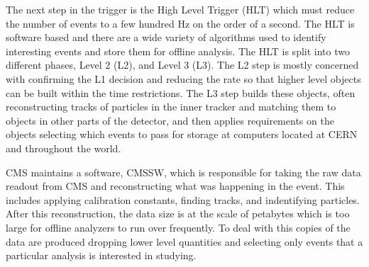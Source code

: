 
The next step in the trigger is the High Level Trigger (HLT) which must reduce the number of events to a few hundred Hz on the order of a second. The HLT
is software based and there are a wide variety of algorithms used to identify interesting events and store them for offline analysis. The HLT is split into two different
phases, Level 2 (L2), and Level 3 (L3). The L2 step is mostly concerned with confirming the L1 decision and reducing the rate so that higher level objects
can be built within the time restrictions. The L3 step builds these objects, often reconstructing tracks of particles in the inner tracker and matching them
to objects in other parts of the detector, and then applies requirements on the objects selecting which events to pass for storage at computers located at CERN
and throughout the world.

CMS maintains a software, CMSSW, which is responsible for taking the raw data readout from CMS and reconstructing what was happening in the event.
This includes applying calibration constants, finding tracks, and indentifying particles.
After this reconstruction, the data size is at the scale of petabytes which is too large for offline analyzers to run over frequently. 
To deal with this copies of the data are produced dropping lower level quantities and selecting only events that a particular analysis is interested in studying.

